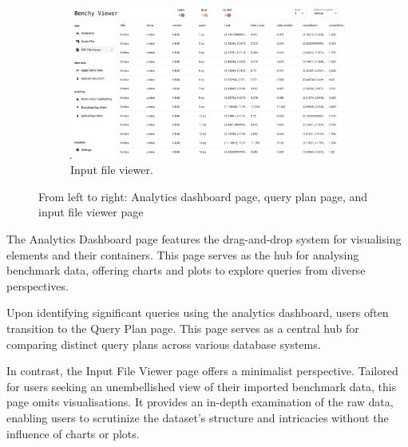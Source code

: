 \begin{figure}[h]
\begin{subfigure}[b]{0.3\linewidth}
      \label{fig:app-query-plan}
  \end{subfigure}
  \hspace{0.5cm} %
  \begin{subfigure}[b]{0.3\linewidth}
    \includegraphics[width=\linewidth]{figures/app-data-viewer.png}
    \caption{Input file viewer.}
      \label{fig:app-data-viewer}
  \end{subfigure}
  \caption{From left to right: Analytics dashboard page, query plan page, and input file viewer page}
  \label{fig:pages}
\end{figure}

The Analytics Dashboard page features the drag-and-drop system for visualising elements and their containers. This page serves as the hub for analysing benchmark data, offering charts and plots to explore queries from diverse perspectives.

Upon identifying significant queries using the analytics dashboard, users often transition to the Query Plan page. This page serves as a central hub for comparing distinct query plans across various database systems. 

In contrast, the Input File Viewer page offers a minimalist perspective. Tailored for users seeking an unembellished view of their imported benchmark data, this page omits visualisations. It provides an in-depth examination of the raw data, enabling users to scrutinize the dataset's structure and intricacies without the influence of charts or plots.















